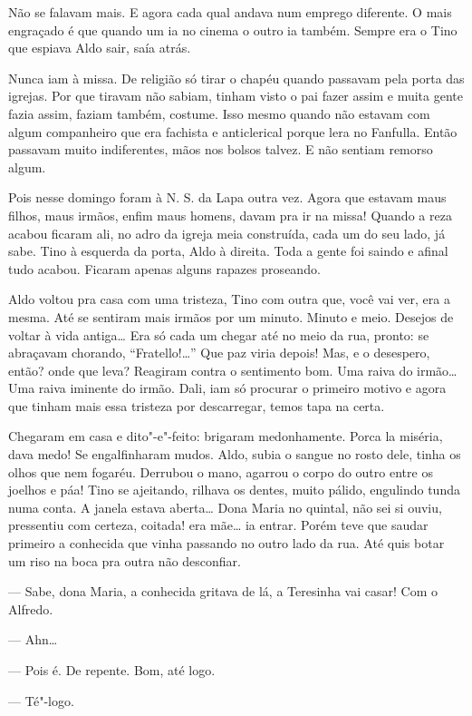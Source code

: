 Não se falavam mais. E agora cada qual andava num emprego diferente. O
mais engraçado é que quando um ia no cinema o outro ia também. Sempre
era o Tino que espiava Aldo sair, saía atrás.

Nunca iam à missa. De religião só tirar o chapéu quando passavam pela
porta das igrejas. Por que tiravam não sabiam, tinham visto o pai fazer
assim e muita gente fazia assim, faziam também, costume. Isso mesmo
quando não estavam com algum companheiro que era fachista e anticlerical
porque lera no Fanfulla. Então passavam muito indiferentes, mãos nos
bolsos talvez. E não sentiam remorso algum.

Pois nesse domingo foram à N. S. da Lapa outra vez. Agora que estavam
maus filhos, maus irmãos, enfim maus homens, davam pra ir na missa!
Quando a reza acabou ficaram ali, no adro da igreja meia construída,
cada um do seu lado, já sabe. Tino à esquerda da porta, Aldo à direita.
Toda a gente foi saindo e afinal tudo acabou. Ficaram apenas alguns
rapazes proseando.

Aldo voltou pra casa com uma tristeza, Tino com outra que, você vai ver,
era a mesma. Até se sentiram mais irmãos por um minuto. Minuto e meio.
Desejos de voltar à vida antiga\ldots{} Era só cada um chegar até no meio da
rua, pronto: se abraçavam chorando, ``Fratello!\ldots{}'' Que paz viria
depois! Mas, e o desespero, então? onde que leva? Reagiram contra o
sentimento bom. Uma raiva do irmão\ldots{} Uma raiva iminente do irmão. Dali,
iam só procurar o primeiro motivo e agora que tinham mais essa tristeza
por descarregar, temos tapa na certa.

Chegaram em casa e dito"-e"-feito: brigaram medonhamente. Porca la
miséria, dava medo! Se engalfinharam mudos. Aldo, subia o sangue no
rosto dele, tinha os olhos que nem fogaréu. Derrubou o mano, agarrou o
corpo do outro entre os joelhos e páa! Tino se ajeitando, rilhava os
dentes, muito pálido, engulindo tunda numa conta. A janela estava
aberta\ldots{} Dona Maria no quintal, não sei si ouviu, pressentiu com
certeza, coitada! era mãe\ldots{} ia entrar. Porém teve que saudar primeiro a
conhecida que vinha passando no outro lado da rua. Até quis botar um
riso na boca pra outra não desconfiar.

--- Sabe, dona Maria, a conhecida gritava de lá, a Teresinha vai casar!
Com o Alfredo.

--- Ahn\ldots{}

--- Pois é. De repente. Bom, até logo.

--- Té"-logo.


